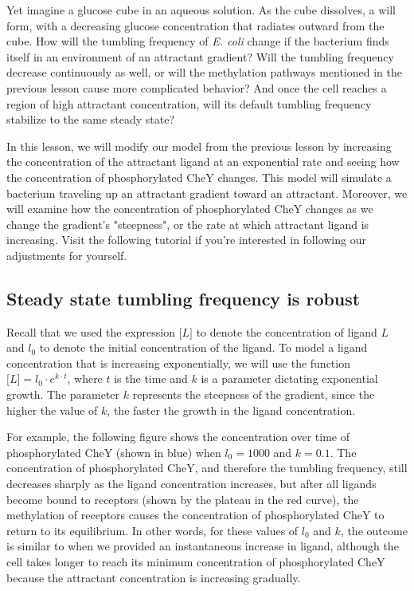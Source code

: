 Yet imagine a glucose cube in an aqueous solution. As the cube dissolves, a  will form, with a decreasing glucose concentration that radiates outward from the cube. How will the tumbling frequency of \textit{E. coli} change if the bacterium finds itself in an environment of an attractant gradient?  Will the tumbling frequency decrease continuously as well, or will the methylation pathways mentioned in the previous lesson cause more complicated behavior? And once the cell reaches a region of high attractant concentration, will its default tumbling frequency stabilize to the same steady state?

In this lesson, we will modify our model from the previous lesson by increasing the concentration of the attractant ligand at an exponential rate and seeing how the concentration of phosphorylated CheY changes. This model will simulate a bacterium traveling up an attractant gradient toward an attractant. Moreover, we will examine how the concentration of phosphorylated CheY changes as we change the gradient's "steepness", or the rate at which attractant ligand is increasing. Visit the following tutorial  if you're interested in following our adjustments for yourself.

\subsection{Steady state tumbling frequency is robust}

Recall that we used the expression $\text{[}L\text{]}$ to denote the concentration of ligand $L$ and $l_0$ to denote the initial concentration of the ligand. To model a ligand concentration that is increasing exponentially, we will use the function $\text{[}L\text{]} = l_0 \cdot e^{k \cdot t}$, where $t$ is the time and $k$ is a parameter dictating exponential growth. The parameter $k$ represents the steepness of the gradient, since the higher the value of $k$, the faster the growth in the ligand concentration.

For example, the following figure shows the concentration over time of phosphorylated CheY (shown in blue) when $l_0 = 1000$ and $k = 0.1$. The concentration of phosphorylated CheY, and therefore the tumbling frequency, still decreases sharply as the ligand concentration increases, but after all ligands become bound to receptors (shown by the plateau in the red curve), the methylation of receptors causes the concentration of phosphorylated CheY to return to its equilibrium. In other words, for these values of $l_0$ and $k$, the outcome is similar to when we provided an instantaneous increase in ligand, although the cell takes longer to reach its minimum concentration of phosphorylated CheY because the attractant concentration is increasing gradually.

